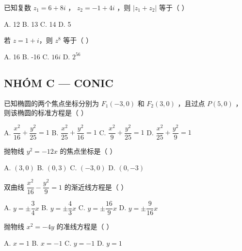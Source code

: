 \documentclass[11pt, a4paper]{article}
\begin{document}
\begin{baitap}[12]
已知复数 $z_1 = 6 + 8i$ ， $z_2 = -1 + 4i$ ，则 $\lvert z_1 + z_2 \rvert$ 等于（ ）
\par\vspace{3pt}
\noindent A. 12 \quad B. 13 \quad C. 14 \quad D. 5
\end{baitap}

\begin{baitap}[13]
若 $z = 1 + i$，则 $z^8$ 等于（ ）
\par\vspace{3pt}
\noindent A. 16 \quad B. -16 \quad C. $16i$ \quad D. $2^{56}$
\end{baitap}

\subsection*{NHÓM C — CONIC}

\begin{baitap}[14]
已知椭圆的两个焦点坐标分别为 $F_1(-3,0)$ 和 $F_2(3,0)$ ，且过点 $P(5,0)$ ，则该椭圆的标准方程是（ ）
\par\vspace{3pt}
\noindent A. $\dfrac{x^2}{16} + \dfrac{y^2}{25} = 1$ \quad B. $\dfrac{x^2}{25} + \dfrac{y^2}{16} = 1$ \quad C. $\dfrac{x^2}{9} + \dfrac{y^2}{25} = 1$ \quad D. $\dfrac{x^2}{25} + \dfrac{y^2}{9} = 1$
\end{baitap}

\begin{baitap}[15]
抛物线 $y^2 = -12x$ 的焦点坐标是（ ）
\par\vspace{3pt}
\noindent A. $(3,0)$ \quad B. $(0,3)$ \quad C. $(-3,0)$ \quad D. $(0, -3)$
\end{baitap}

\begin{baitap}[16]
双曲线 $\dfrac{x^2}{16} - \dfrac{y^2}{9} = 1$ 的渐近线方程是（ ）
\par\vspace{3pt}
\noindent A. $y = \pm\dfrac{3}{4}x$ \quad B. $y = \pm\dfrac{4}{3}x$ \quad C. $y = \pm\dfrac{16}{9}x$ \quad D. $y = \pm\dfrac{9}{16}x$
\end{baitap}

\begin{baitap}[17]
抛物线 $x^2 = -4y$ 的准线方程是（ ）
\par\vspace{3pt}
\noindent A. $x = 1$ \quad B. $x = -1$ \quad C. $y = -1$ \quad D. $y = 1$
\end{baitap}
\end{document}
